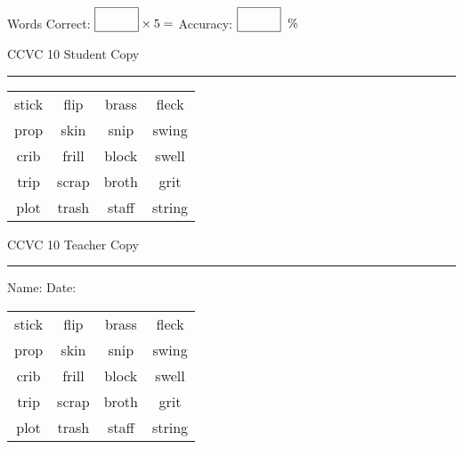 \documentclass{memoir}
\begin{document}
\normalsize

Words Correct: $\fbox{\phantom{\huge 100}} \times 5 = $ Accuracy: $\fbox{\phantom{\huge 100}}\;\; \%$ 

\vfill

\newpage


\footnotesize \noindent
CCVC 10 \hfill Student Copy
\smallskip
\hrule

\Large

\setlength{\tabcolsep}{14pt}
\def\arraystretch{3}

{\selectfont


\begin{vplace}[0.5]
\begin{center}
\begin{tabular}{cccc}
stick & flip & brass       & fleck             \\
prop & skin & snip & swing \\
crib & frill & block & swell \\
trip & scrap & broth    & grit      \\
plot & trash & staff            & string \\
\end{tabular}
\end{center}
\end{vplace}

}

\newpage

\footnotesize \noindent
CCVC 10 \hfill Teacher Copy
\smallskip
\hrule

\normalsize

\vfill

\noindent
Name: \underline{\hspace{1.75in}} \hfill Date: \underline{\hspace{1in}}

\Large

{\selectfont


\begin{vplace}[0.5]
\begin{center}
\begin{tabular}{cccc}
stick & flip & brass       & fleck             \\
prop & skin & snip & swing \\
crib & frill & block & swell \\
trip & scrap & broth    & grit      \\
plot & trash & staff            & string \\
\end{tabular}
\end{center}
\end{vplace}



}
\end{document}
